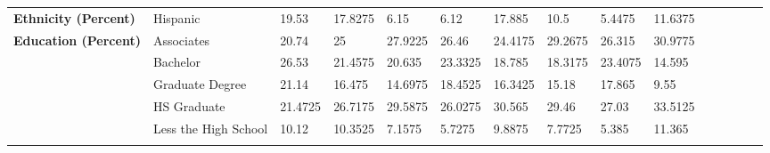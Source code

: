 \documentclass[12pt]{article}
\begin{document}
\begin{table}[]
{\begin{tabular}{lllllllllllllll}
  \textbf{Ethnicity (Percent)}        & Hispanic                                     & 19.53            & 17.8275         & 6.15              & 6.12             & 17.885           & 10.5              & 5.4475         & 11.6375        &  &  &  &  &  \\
  \textbf{Education (Percent)}        & Associates                                   & 20.74            & 25              & 27.9225           & 26.46            & 24.4175          & 29.2675           & 26.315         & 30.9775        &  &  &  &  &  \\
                            & Bachelor                                     & 26.53            & 21.4575         & 20.635            & 23.3325          & 18.785           & 18.3175           & 23.4075        & 14.595         &  &  &  &  &  \\
                            & Graduate Degree                              & 21.14            & 16.475          & 14.6975           & 18.4525          & 16.3425          & 15.18             & 17.865         & 9.55           &  &  &  &  &  \\
                            & HS Graduate                                  & 21.4725          & 26.7175         & 29.5875           & 26.0275          & 30.565           & 29.46             & 27.03          & 33.5125        &  &  &  &  &  \\
                            & Less the High School                         & 10.12            & 10.3525         & 7.1575            & 5.7275           & 9.8875           & 7.7725            & 5.385          & 11.365         &  &  &  &  &  \\
                            &                                              &                  &                 &                   &                  &                  &                   &                &                &  &  &  &  & 
  \end{tabular}%
  }
  \end{table}
    
\end{document}
